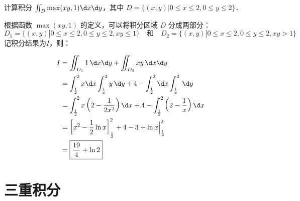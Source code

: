 \documentclass[12pt, a4paper, oneside, UTF8]{ctexbook}
\begin{document}
\begin{example}
    计算积分 $\iint_D \max(xy,1) \d x \d y$，其中 $D = \{(x,y)|0 \le x \le 2, 0 \le y \le 2\}$．
\end{example}
\begin{solution}
根据函数 $\max(xy,1)$ 的定义，可以将积分区域 $D$ 分成两部分：\[
D_1 = \{(x,y)|0 \le x \le 2, 0 \le y \le 2, xy \le 1\} \quad \text{和} \quad D_2 = \{(x,y)|0 \le x \le 2, 0 \le y \le 2, xy > 1\}
\]记积分结果为$I$，则：\qquad\qquad\qquad\qquad\qquad\qquad\qquad\qquad\qquad\qquad{}
\begin{align*}
    I &= \iint_{D_1} 1 \, \d x\d y+ \iint_{D_2} xy \, \d x\d y \\
    &= \int_\frac{1}{2}^2 x\d x \int_\frac{1}{x}^{2} y \, \d y + 4 -\int_\frac{1}{2}^2 \d x \int_\frac{1}{x}^2  \, \d y \\
    &= \int_{\frac{1}{2}}^{2} x\left(2-\frac{1}{2x^2} \right) \d x + 4 - \int_{\frac{1}{2}}^{2} \left( 2- \frac{1}{x} \right) \d x\\
    &= \left[ x^2 - \frac{1}{2} \ln x \right]_{\frac{1}{2}}^{2} + 4 - 3 + \ln x\Big|_{\frac{1}{2}}^{2} \\
    &= \boxed{\frac{19}{4} + \ln 2}
\end{align*}
\end{solution}
\section{三重积分}
\end{document}
